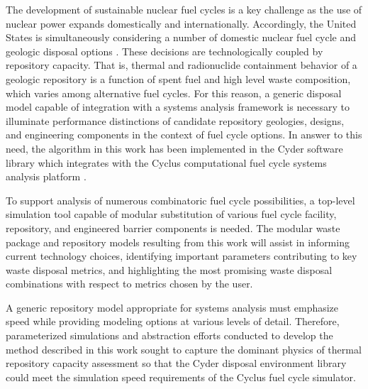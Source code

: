 
The development of sustainable nuclear fuel cycles is a key challenge as the 
use of nuclear power expands domestically and internationally.  Accordingly, 
the United States is simultaneously considering a number of domestic nuclear fuel 
cycle and geologic disposal options \cite{doe_strategy_2013}.  These decisions 
are technologically coupled by repository capacity. That is, thermal and 
radionuclide containment behavior of a geologic repository is a function of 
spent fuel and high level waste composition, which varies among alternative 
fuel cycles. For this reason, a generic disposal model capable of integration 
with a systems analysis framework is necessary to illuminate performance 
distinctions of candidate repository geologies, designs, and engineering 
components in the context of fuel cycle options.  In answer to this need, the 
algorithm in this work has been implemented in the Cyder software library which 
integrates with the Cyclus computational fuel cycle systems analysis platform 
\cite{huff_cyder_2013,wilson_cyclus:_2012}. 



To support analysis of numerous combinatoric fuel cycle possibilities, a 
top-level simulation tool capable of modular substitution of various fuel cycle 
facility, repository, and engineered barrier components is needed. The modular 
waste package and repository models resulting from this work will assist in 
informing current technology choices, identifying important parameters 
contributing to key waste disposal metrics, and highlighting the most promising 
waste disposal combinations with respect to metrics chosen by the user. 


A generic repository model appropriate for systems analysis must emphasize 
speed while providing modeling options at various levels of 
detail. Therefore, parameterized simulations and abstraction efforts conducted to develop 
the method described in this work sought to capture the dominant physics of 
thermal repository capacity assessment so that the Cyder disposal environment 
library could meet the simulation speed requirements of the Cyclus fuel cycle 
simulator.


